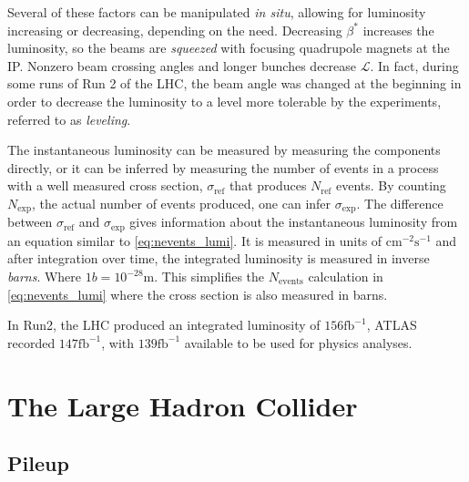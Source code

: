 Several of these factors can be manipulated \emph{in situ}, allowing for luminosity increasing or decreasing, depending on the need. Decreasing $\beta^*$ increases the luminosity, so the beams are \emph{squeezed} with focusing quadrupole magnets at the \ac{IP}. Nonzero beam crossing angles and longer bunches decrease $\mathcal{L}$. In fact, during some runs of Run 2 of the \ac{LHC}, the beam angle was changed at the beginning in order to decrease the luminosity to a level more tolerable by the experiments, referred to as \emph{leveling}. 

The instantaneous luminosity can be measured by measuring the components directly, or it can be inferred by measuring the number of events in a process with a well measured cross section, $\sigma_{\textrm{ref}}$ that produces $N_{\textrm{ref}}$ events. By counting $N_{\textrm{exp}}$, the actual number of events produced, one can infer $\sigma_{\textrm{exp}}$. The difference between $\sigma_{\textrm{ref}}$ and $\sigma_{\textrm{exp}}$ gives information about the instantaneous luminosity from an equation similar to \autoref{eq:nevents_lumi}. It is measured in units of $\textrm{cm}^{-2}\textrm{s}^{-1}$ and after integration over time, the integrated luminosity is measured in inverse \emph{barns}. Where $1 b = 10^{-28} \textrm{m}$. This simplifies the $N_{\textrm{events}}$ calculation in \autoref{eq:nevents_lumi} where the cross section is also measured in barns.




In Run2, the \ac{LHC} produced an integrated luminosity of $156 \textrm{fb}^{-1}$, \ac{ATLAS} recorded $147 \textrm{fb}^{-1}$, with $139 \textrm{fb}^{-1}$ available to be used for physics analyses.




\section{The Large Hadron Collider}

\subsection{Pileup}

